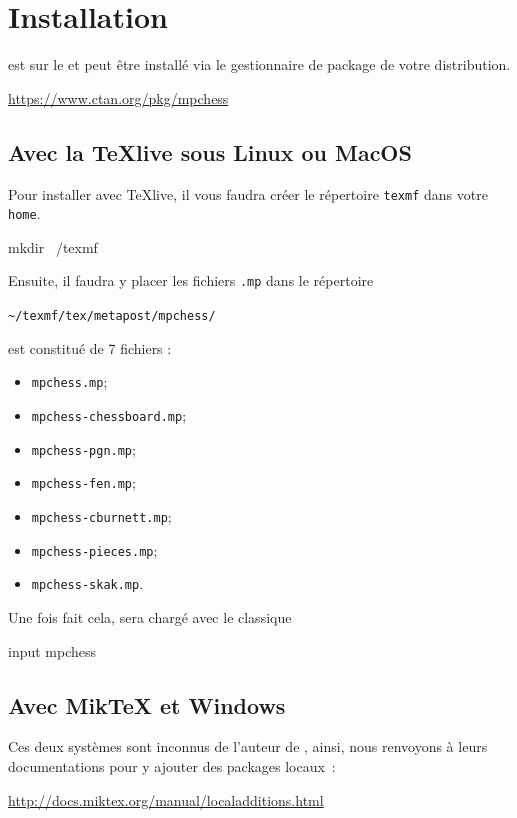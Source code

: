 \documentclass[french]{ltxdoc}
\begin{document}
\section{Installation}

\mpchess est sur le \ctan{} et peut être installé via le gestionnaire de package
de votre distribution.

\begin{center}
  \url{https://www.ctan.org/pkg/mpchess}
\end{center}


\subsection{Avec la \TeX live sous Linux ou MacOS}

Pour installer \mpchess avec \TeX live, il vous faudra créer le répertoire
\lstinline+texmf+ dans votre \lstinline+home+.

\begin{commandshell}
mkdir ~/texmf
\end{commandshell}

Ensuite, il faudra y placer les fichiers \lstinline+.mp+ dans le répertoire \begin{center}
  \lstinline+~/texmf/tex/metapost/mpchess/+
\end{center}

\mpchess est constitué de 7 fichiers  :
\begin{itemize}
  \item \verb+mpchess.mp+;
  \item \verb+mpchess-chessboard.mp+;
  \item \verb+mpchess-pgn.mp+;
  \item \verb+mpchess-fen.mp+;
  \item \verb+mpchess-cburnett.mp+;
  \item \verb+mpchess-pieces.mp+;
  \item \verb+mpchess-skak.mp+.
\end{itemize}

Une fois fait cela, \mpchess sera chargé avec le classique
\begin{mpcode}
input mpchess
\end{mpcode}

\subsection{Avec Mik\TeX{} et Windows}

Ces deux systèmes sont inconnus de l’auteur de \mpchess, ainsi, nous renvoyons à
leurs documentations pour y ajouter des packages locaux :
\begin{center}
  \url{http://docs.miktex.org/manual/localadditions.html}
\end{center}
\end{document}

